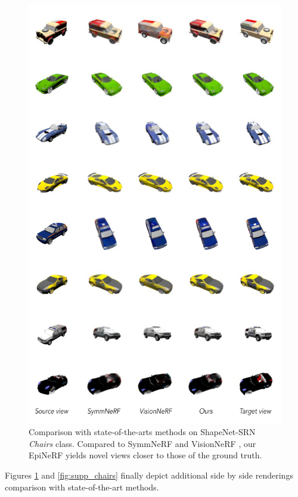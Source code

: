 \begin{figure}[htp!]
    \center
  \includegraphics[width=.9\linewidth]{images/epinerf/supp_cars_ex.png}
  \caption{Comparison with state-of-the-arts methods on ShapeNet-SRN \textit{Chairs} class.   
 Compared to SymmNeRF \citep{li2022symmnerf} and VisionNeRF \citep{lin2023vision}, our EpiNeRF yields novel views closer to those of the ground truth. }
  \label{fig:supp_cars}
\end{figure}

Figures \ref{fig:supp_cars} and \ref{fig:supp_chairs} finally depict additional side by side renderings comparison with state-of-the-art methods. 

